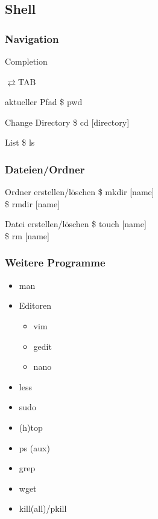 \documentclass{beamer}
\begin{document}
    \subsection{Shell}
    \begin{frame}
        \frametitle{Navigation}
        \begin{block}{Completion}
            \begin{Huge}
                $\rightleftarrows$TAB
            \end{Huge}
        \end{block}
        \begin{block}{aktueller Pfad}
            \$ pwd
        \end{block}
        \begin{block}{Change Directory}
            \$ cd [directory]
        \end{block}
        \begin{block}{List}
            \$ ls
        \end{block}
    \end{frame}

    \begin{frame}
        \frametitle{Dateien/Ordner}
        \begin{block}{Ordner erstellen/l\"oschen}
            \$ mkdir [name] \\
            \$ rmdir [name]
        \end{block}
        \begin{block}{Datei erstellen/l\"oschen}
            \$ touch [name] \\
            \$ rm [name]
        \end{block}
    \end{frame}

    \begin{frame}
        \frametitle{Weitere Programme}
        \begin{itemize}
            \item man
            \item Editoren
            \begin{itemize}
                \item vim
                \item gedit
                \item nano
            \end{itemize}
            \item less
            \item sudo
            \item (h)top
            \item ps (aux)
            \item grep
            \item wget
            \item kill(all)/pkill
        \end{itemize}
    \end{frame}
\end{document}
